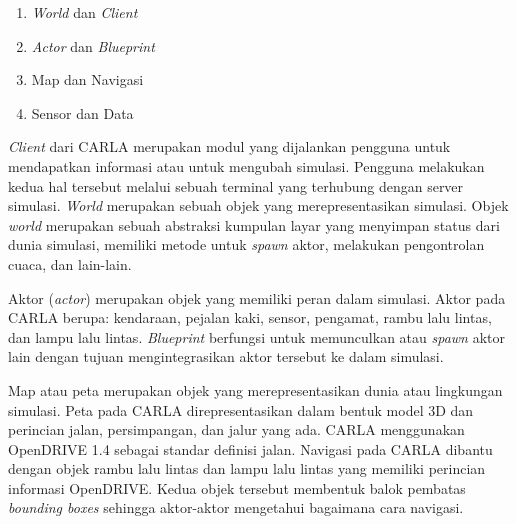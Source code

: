 \begin{enumerate}

    \item \textit{World} dan \textit{Client}
    \item \textit{Actor} dan \textit{Blueprint}
    \item Map dan Navigasi
    \item Sensor dan Data

\end{enumerate}


\textit{Client} dari CARLA merupakan modul yang dijalankan pengguna untuk
mendapatkan informasi atau untuk mengubah simulasi. Pengguna melakukan kedua hal
tersebut melalui sebuah terminal yang terhubung dengan server simulasi.
\textit{World} merupakan sebuah objek yang merepresentasikan simulasi. Objek
\textit{world} merupakan sebuah abstraksi kumpulan layar yang menyimpan status
dari dunia simulasi, memiliki metode untuk \textit{spawn} aktor, melakukan
pengontrolan cuaca, dan lain-lain.


Aktor (\textit{actor}) merupakan objek yang memiliki peran dalam simulasi. Aktor
pada CARLA berupa: kendaraan, pejalan kaki, sensor, pengamat, rambu lalu lintas,
dan lampu lalu lintas. \textit{Blueprint} berfungsi untuk memunculkan atau
\textit{spawn} aktor lain dengan tujuan mengintegrasikan aktor tersebut ke
dalam simulasi.


Map atau peta merupakan objek yang merepresentasikan dunia atau lingkungan
simulasi. Peta pada CARLA direpresentasikan dalam bentuk model 3D dan perincian
jalan, persimpangan, dan jalur yang ada. CARLA menggunakan OpenDRIVE 1.4 sebagai
standar definisi jalan. Navigasi pada CARLA dibantu dengan objek rambu lalu
lintas dan lampu lalu lintas yang memiliki perincian informasi OpenDRIVE. Kedua
objek tersebut membentuk balok pembatas \textit{bounding boxes} sehingga
aktor-aktor mengetahui bagaimana cara navigasi.

